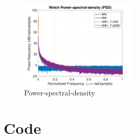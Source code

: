 \documentclass{article}
\begin{document}
\begin{figure}[H]
    \centering
    \includegraphics[width=0.5\textwidth]{psd}
    \caption{Power-spectral-density}
    \label{fig:autocorr}
\end{figure}

\newpage
\section*{Code}

\end{document}

